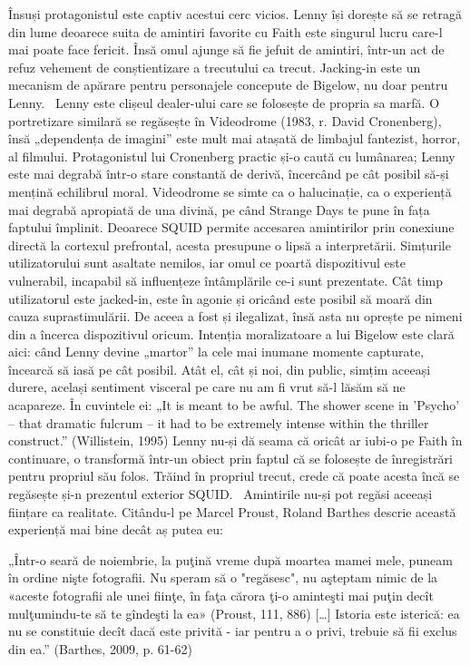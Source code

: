 \documentclass[a4paper, 12pt]{article}
\begin{document}
Însuși protagonistul este captiv acestui cerc vicios. Lenny își dorește să se retragă din lume deoarece suita de amintiri favorite cu Faith este singurul lucru care-l mai poate face fericit. Însă omul ajunge să fie jefuit de amintiri, într-un act de refuz vehement de conștientizare a trecutului ca trecut. Jacking-in este un mecanism de apărare pentru personajele concepute de Bigelow, nu doar pentru Lenny. 
Lenny este clișeul dealer-ului care se folosește de propria sa marfă. O portretizare similară se regăsește în Videodrome (1983, r. David Cronenberg), însă „dependența de imagini” este mult mai atașată de limbajul fantezist, horror, al filmului. Protagonistul lui Cronenberg practic și-o caută cu lumânarea; Lenny este mai degrabă într-o stare constantă de derivă, încercând pe cât posibil să-și mențină echilibrul moral. Videodrome se simte ca o halucinație, ca o experiență mai degrabă apropiată de una divină, pe când Strange Days te pune în fața faptului împlinit.
Deoarece SQUID permite accesarea amintirilor prin conexiune directă la cortexul prefrontal, acesta presupune o lipsă a interpretării. Simțurile utilizatorului sunt asaltate nemilos, iar omul ce poartă dispozitivul este vulnerabil, incapabil să influențeze întâmplările ce-i sunt prezentate. Cât timp utilizatorul este jacked-in, este în agonie și oricând este posibil să moară din cauza suprastimulării. De aceea a fost și ilegalizat, însă asta nu oprește pe nimeni din a încerca dispozitivul oricum. Intenția moralizatoare a lui Bigelow este clară aici: când Lenny devine „martor” la cele mai inumane momente capturate, încearcă să iasă pe cât posibil. Atât el, cât și noi, din public, simțim aceeași durere, același sentiment visceral pe care nu am fi vrut să-l lăsăm să ne acapareze. În cuvintele ei: „It is meant to be awful. The shower scene in 'Psycho' -- that dramatic fulcrum -- it had to be extremely intense within the thriller construct.” (Willistein, 1995)
Lenny nu-și dă seama că oricât ar iubi-o pe Faith în continuare, o transformă într-un obiect prin faptul că se folosește de înregistrări pentru propriul său folos. Trăind în propriul trecut, crede că poate acesta încă se regăsește și-n prezentul exterior SQUID. 
Amintirile nu-și pot regăsi aceeași ființare ca realitate. Citându-l pe Marcel Proust, Roland Barthes descrie această experiență mai bine decât aș putea eu:

„Într-o seară de noiembrie, la puţină vreme după moartea mamei mele, puneam în ordine nişte fotografii. Nu speram să o "regăsesc", nu aşteptam nimic de la «aceste fotografii ale unei fiinţe, în faţa cărora ţi-o aminteşti mai puţin decît mulţumindu-te să te gîndeşti la ea» (Proust, 111, 886) […] Istoria este isteri­că: ea nu se constituie decît dacă este privită - iar pentru a o privi, trebuie să fii exclus din ea.” (Barthes, 2009, p. 61-62)
\end{document}
